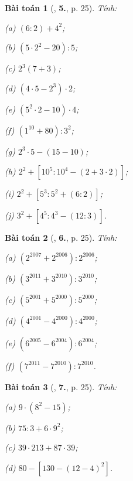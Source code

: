 \documentclass{article}
\numberwithin{equation}{section}
\newtheorem{baitoan}{Bài toán}[section]
\begin{document}
\begin{baitoan}[\cite{Trong_Toan_6_2021}, \textbf{5.}, p. 25]
	Tính:
	\begin{enumerate*}
		\item[(a)] $(6:2) + 4^2$;
		\item[(b)] $(5\cdot 2^2 - 20):5$;
		\item[(c)] $2^3(7 + 3)$;
		\item[(d)] $(4\cdot 5 - 2^3)\cdot 2$;
		\item[(e)] $(5^2\cdot 2 - 10)\cdot 4$;
		\item[(f)] $(1^{10} + 80):3^2$;
		\item[(g)] $2^3\cdot 5 - (15 - 10)$;
		\item[(h)] $2^2 + [10^5:10^4 - (2 + 3\cdot 2)]$;
		\item[(i)] $2^2 + [5^3:5^2 + (6:2)]$;
		\item[(j)] $3^2 + [4^5:4^3 - (12:3)]$.
	\end{enumerate*}
\end{baitoan}

\begin{baitoan}[\cite{Trong_Toan_6_2021}, \textbf{6.}, p. 25]
	Tính:
	\begin{enumerate*}
		\item[(a)] $(2^{2007} + 2^{2006}):2^{2006}$;
		\item[(b)] $(3^{2011} + 3^{2010}):3^{2010}$;
		\item[(c)] $(5^{2001} + 5^{2000}):5^{2000}$;
		\item[(d)] $(4^{2001} - 4^{2000}):4^{2000}$;
		\item[(e)] $(6^{2005} - 6^{2004}):6^{2004}$;
		\item[(f)] $(7^{2011} - 7^{2010}):7^{2010}$.
	\end{enumerate*}
\end{baitoan}

\begin{baitoan}[\cite{Trong_Toan_6_2021}, \textbf{7.}, p. 25]
	Tính:
	\begin{enumerate*}
		\item[(a)] $9\cdot(8^2 - 15)$;
		\item[(b)] $75:3 + 6\cdot 9^2$;
		\item[(c)] $39\cdot 213 + 87\cdot 39$;
		\item[(d)] $80 - [130 - (12 - 4)^2]$.
	\end{enumerate*}
\end{baitoan}
\end{document}
